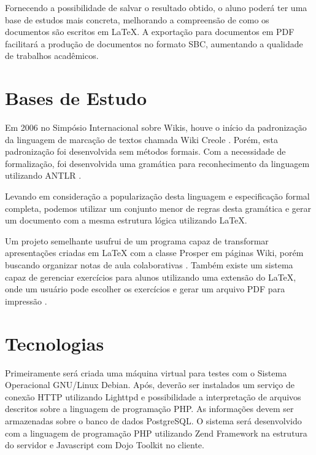 \documentclass{article}
\begin{document}
Fornecendo a possibilidade de salvar o resultado obtido, o aluno poderá ter uma
base de estudos mais concreta, melhorando a compreensão de como os documentos
são escritos em \LaTeX{}. A exportação para documentos em PDF facilitará a
produção de documentos no formato SBC, aumentando a qualidade de trabalhos
acadêmicos.

\section{Bases de Estudo}
\label{sec:bases-estudo}

Em 2006 no Simpósio Internacional sobre Wikis, houve o início da padronização da
linguagem de marcação de textos chamada Wiki Creole \cite{a21-junghans}. Porém,
esta padronização foi desenvolvida sem métodos formais. Com a necessidade de
formalização, foi desenvolvida uma gramática para reconhecimento da linguagem
utilizando ANTLR \cite{a4-junghans}.

Levando em consideração a popularização desta linguagem e especificação formal
completa, podemos utilizar um conjunto menor de regras desta gramática e gerar
um documento com a mesma estrutura lógica utilizando \LaTeX{}.

Um projeto semelhante usufrui de um programa capaz de transformar apresentações
criadas em \LaTeX{} com a classe Prosper em páginas Wiki, porém buscando
organizar notas de aula colaborativas \cite{p267-oneill}. Também existe um
sistema capaz de gerenciar exercícios para alunos utilizando uma extensão do
\LaTeX{}, onde um usuário pode escolher os exercícios e gerar um arquivo PDF
para impressão \cite{p161-gregorio-rodriguez}.

\section{Tecnologias}
\label{sec:tecnologias}

Primeiramente será criada uma máquina virtual para testes com o Sistema
Operacional GNU/Linux Debian. Após, deverão ser instalados um serviço de conexão
HTTP utilizando Lighttpd e possibilidade a interpretação de arquivos descritos
sobre a linguagem de programação PHP. As informações devem ser armazenadas sobre
o banco de dados PostgreSQL. O sistema será desenvolvido com a linguagem de
programação PHP utilizando Zend Framework na estrutura do servidor e Javascript
com Dojo Toolkit no cliente.
\end{document}
